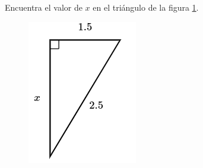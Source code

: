 Encuentra el valor de $x$ en el triángulo de la figura \ref{fig:lados_pitagoras_30}.

\begin{minipage}[t][][t]{0.3\textwidth}
    \begin{figure}[H]
        \centering
        \includegraphics[width=0.8\linewidth]{../images/lados_pitagoras_30.png}
        \caption{}
        \label{fig:lados_pitagoras_30}
    \end{figure}
\end{minipage}\hfill
